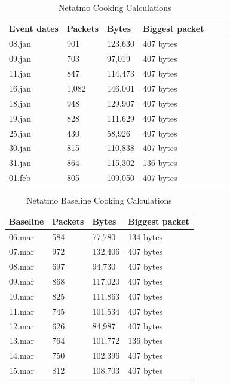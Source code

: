 \begin{table}[H]
    \centering
    \caption{Netatmo Cooking Calculations}
    \begin{tabular}{|l|l|l|l|l|l|}
    \hline
        \textbf{Event dates} & \textbf{Packets} & \textbf{Bytes} & \textbf{Biggest packet} \\ \hline
        08.jan & 901 & 123,630 & 407 bytes\\ \hline
        09.jan & 703 & 97,019 & 407 bytes \\ \hline
        11.jan & 847 & 114,473 & 407 bytes\\ \hline
        16.jan & 1,082 & 146,001 & 407 bytes\\ \hline
        18.jan & 948 & 129,907 & 407 bytes\\ \hline
        19.jan & 828 & 111,629 & 407 bytes \\ \hline
        25.jan & 430 & 58,926 & 407 bytes \\ \hline
        30.jan & 815 & 110,838 & 407 bytes \\ \hline
        31.jan & 864 & 115,302 & 136 bytes \\ \hline
        01.feb & 805 & 109,050 & 407 bytes \\ \hline
    \end{tabular}
    \label{tab:NetatmoCookingCalculations}
\end{table}

\begin{table}[!ht]
    \centering
    \caption{Netatmo Baseline Cooking Calculations}
    \begin{tabular}{|l|l|l|l|}
    \hline
        \textbf{Baseline} & \textbf{Packets} & \textbf{Bytes} & \textbf{Biggest packet} \\ \hline
        06.mar & 584 & 77,780 & 134 bytes\\ \hline
        07.mar & 972 & 132,406 & 407 bytes\\ \hline
        08.mar & 697 & 94,730 & 407 bytes \\ \hline
        09.mar & 868 & 117,020 & 407 bytes \\ \hline
        10.mar & 825 & 111,863 & 407 bytes \\ \hline
        11.mar & 745 & 101,534 & 407 bytes \\ \hline
        12.mar & 626 & 84,987 & 407 bytes \\ \hline
        13.mar & 764 & 101,772 & 136 bytes \\ \hline
        14.mar & 750 & 102,396 & 407 bytes \\ \hline
        15.mar & 812 & 108,703 & 407 bytes \\ \hline
    \end{tabular}
    \label{tab:NetatmoBaselineCookingCalculations}
\end{table}

